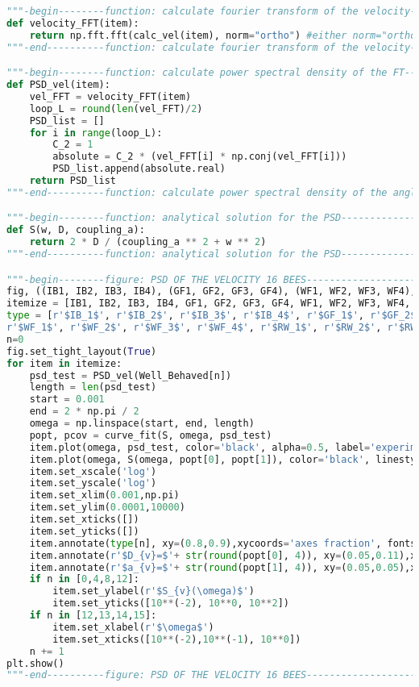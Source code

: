 \begin{lstlisting}[language=Python, basicstyle=\tiny, frame=single, keywordstyle=\color{teal}, commentstyle=\color{olive}, stringstyle=\color{red}]
"""-begin--------function: calculate fourier transform of the velocity-------"""
def velocity_FFT(item):
    return np.fft.fft(calc_vel(item), norm="ortho") #either norm="ortho" here or divided by C_2 in PSD()
"""-end----------function: calculate fourier transform of the velocity-------"""

"""-begin--------function: calculate power spectral density of the FT--------"""
def PSD_vel(item):
    vel_FFT = velocity_FFT(item)
    loop_L = round(len(vel_FFT)/2)
    PSD_list = []
    for i in range(loop_L):
        C_2 = 1
        absolute = C_2 * (vel_FFT[i] * np.conj(vel_FFT[i]))
        PSD_list.append(absolute.real)
    return PSD_list
"""-end----------function: calculate power spectral density of the angle FT--"""

"""-begin--------function: analytical solution for the PSD-------------------"""
def S(w, D, coupling_a):
    return 2 * D / (coupling_a ** 2 + w ** 2)
"""-end----------function: analytical solution for the PSD-------------------"""

"""-begin--------figure: PSD OF THE VELOCITY 16 BEES-------------------------"""
fig, ((IB1, IB2, IB3, IB4), (GF1, GF2, GF3, GF4), (WF1, WF2, WF3, WF4), (RW1, RW2, RW3, RW4)) = plt.subplots(4, 4, figsize=(10,10))
itemize = [IB1, IB2, IB3, IB4, GF1, GF2, GF3, GF4, WF1, WF2, WF3, WF4, RW1, RW2, RW3, RW4]
type = [r'$IB_1$', r'$IB_2$', r'$IB_3$', r'$IB_4$', r'$GF_1$', r'$GF_2$', r'$GF_3$', r'$GF_4$', 
r'$WF_1$', r'$WF_2$', r'$WF_3$', r'$WF_4$', r'$RW_1$', r'$RW_2$', r'$RW_3$', r'$RW_4$']
n=0
fig.set_tight_layout(True)
for item in itemize:
    psd_test = PSD_vel(Well_Behaved[n])
    length = len(psd_test)
    start = 0.001
    end = 2 * np.pi / 2
    omega = np.linspace(start, end, length)
    popt, pcov = curve_fit(S, omega, psd_test)
    item.plot(omega, psd_test, color='black', alpha=0.5, label='experiment')
    item.plot(omega, S(omega, popt[0], popt[1]), color='black', linestyle='dashdot', label='model fit')
    item.set_xscale('log')
    item.set_yscale('log')
    item.set_xlim(0.001,np.pi)
    item.set_ylim(0.0001,10000)
    item.set_xticks([])
    item.set_yticks([])
    item.annotate(type[n], xy=(0.8,0.9),xycoords='axes fraction', fontsize=12)
    item.annotate(r'$D_{v}=$'+ str(round(popt[0], 4)), xy=(0.05,0.11),xycoords='axes fraction', fontsize=10)
    item.annotate(r'$a_{v}=$'+ str(round(popt[1], 4)), xy=(0.05,0.05),xycoords='axes fraction', fontsize=10)
    if n in [0,4,8,12]:
        item.set_ylabel(r'$S_{v}(\omega)$')
        item.set_yticks([10**(-2), 10**0, 10**2])
    if n in [12,13,14,15]:
        item.set_xlabel(r'$\omega$')
        item.set_xticks([10**(-2),10**(-1), 10**0])
    n += 1
plt.show()
"""-end----------figure: PSD OF THE VELOCITY 16 BEES-------------------------"""


\end{lstlisting}
